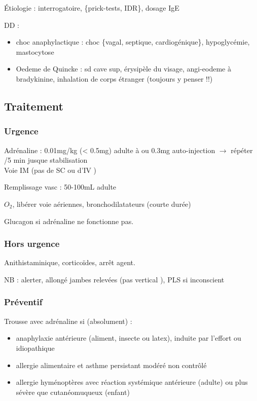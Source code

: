 \documentclass{book}
\begin{document}
Étiologie : interrogatoire, \{prick-tests, IDR\}, dosage IgE

DD : 

\begin{itemize}
\item choc anaphylactique : choc \{vagal, septique, cardiogénique\}, hypoglycémie, mastocytose
\item Oedeme de Quincke : sd cave sup, érysipèle du visage, angi-eodeme à
bradykinine, inhalation de corps étranger (toujours y penser !!)
\end{itemize}


\subsection{Traitement}
\label{sec:org48fd0a5}
\subsubsection{Urgence}
\label{sec:orgc150657}
Adrénaline : 0.01mg/kg (< 0.5mg) adulte à \faHospitalO{} ou  0.3mg
auto-injection \(\rightarrow\) répéter /5 min jusque stabilisation\\
Voie IM (pas de SC ou d'IV \danger{})

Remplissage vasc : 50-100mL adulte

\(O_2\), libérer voie aériennes, bronchodilatateurs (courte durée)

Glucagon si adrénaline ne fonctionne pas. 

\subsubsection{Hors urgence}
\label{sec:orgf0e16dc}
Anithistaminique, corticoïdes, arrêt agent.

NB : alerter, allongé jambes relevées (pas vertical \danger{} \faBomb), PLS si
inconscient

\subsubsection{Préventif}
\label{sec:orgb373f3a}
Trousse avec adrénaline si (absolument) :

\begin{itemize}
\item anaphylaxie antérieure (aliment, insecte ou latex), induite par l'effort
ou idiopathique
\item allergie alimentaire et asthme persistant modéré non contrôlé
\item allergie hyménoptères avec réaction systémique antérieure (adulte) ou
plus sévère que cutanéomuqueux (enfant)
\end{itemize}
\end{document}
